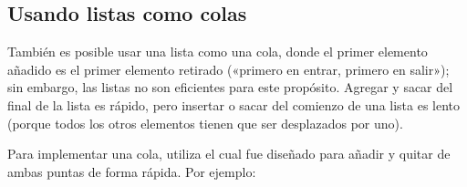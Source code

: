 \documentclass[a5paper,10pt,spanish]{sphinxmanual}
\begin{document}
\subsection{Usando listas como colas}
\label{\detokenize{tutorial/datastructures:using-lists-as-queues}}\label{\detokenize{tutorial/datastructures:tut-lists-as-queues}}
\sphinxAtStartPar
También es posible usar una lista como una cola, donde el primer elemento añadido es el primer elemento retirado («primero en entrar, primero en salir»); sin embargo, las listas no son eficientes para este propósito. Agregar y sacar del final de la lista es rápido, pero insertar o sacar del comienzo de una lista es lento (porque todos los otros elementos tienen que ser desplazados por uno).

\sphinxAtStartPar
Para implementar una cola, utiliza  el cual fue diseñado para añadir y quitar de ambas puntas de forma rápida. Por ejemplo:

\begin{sphinxVerbatim}[commandchars=\\\{\}]
   
  \PYG{p}{[}  \PYG{p}{]}
           
          
                 
                 
                           
\end{sphinxVerbatim}
\end{document}
